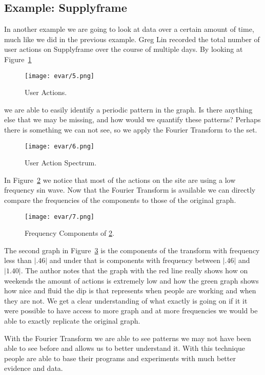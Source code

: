 \documentclass [../article.tex]{subfiles}
\begin{document}
  \subsection{Example: Supplyframe}
  In another example we are going to look at data over a certain
  amount of time, much like we did in the previous example.
  Greg Lin recorded the total number of
  user actions on Supplyframe over the course of multiple days.
  By looking at Figure~\ref{fig:useractions}
  \begin{figure}[htbp]
    \centering
    \texttt{[image: evar/5.png]}
    \caption{User Actions.}
    \label{fig:useractions}
  \end{figure}
  we are able to easily identify a periodic pattern in
  the graph. Is there anything else that we may be missing, and
  how would we quantify these patterns?
  Perhaps there is something we can not see, so we apply the
  Fourier Transform to the set.
  \begin{figure}[htbp]
    \centering
    \texttt{[image: evar/6.png]}
    \caption{User Action Spectrum.}
    \label{fig:actionspectrum}
  \end{figure}
  In Figure~\ref{fig:actionspectrum} we notice that most of the actions
  on the site are using a low frequency sin wave. Now that the Fourier
  Transform is available we can directly compare the frequencies of the
  components to those of the original graph.
  \begin{figure}[htbp]
    \centering
    \texttt{[image: evar/7.png]}
    \caption{Frequency Components of \ref{fig:actionspectrum}.}
    \label{fig:idk}
  \end{figure}
  The second graph in Figure~\ref{fig:idk} is the components of the
  transform with frequency less than $|.46|$ and under that is
  components with frequency between $|.46|$ and $|1.40|$.  The author
  notes that  the graph with the red line really shows how on
  weekends the amount of actions is extremely low and how the
  green graph shows how nice and fluid the dip is that represents
  when people are working and when they are not. We get a clear
  understanding of what exactly is going on if it it were possible
  to have access to more graph and at more frequencies we would be
  able to exactly replicate the original graph.

  With the Fourier Transform we are able to see patterns we may not
  have been able to see before and allows us to better
  understand it. With this technique people are able to
  base their programs and experiments with much better evidence
  and data.
\end{document}

